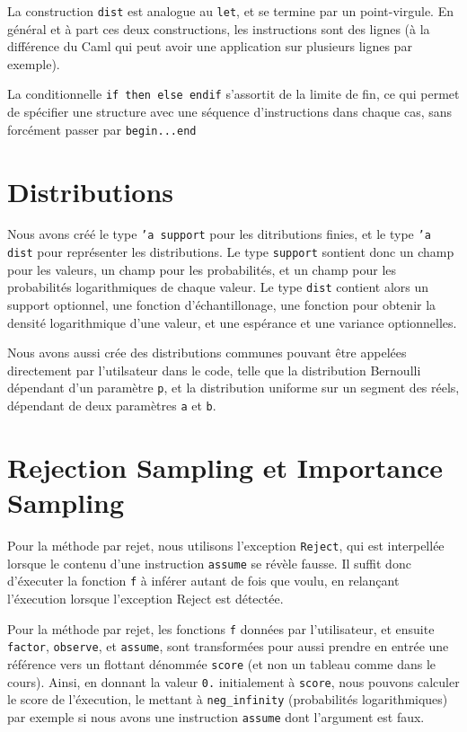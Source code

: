 \documentclass[svgnames]{article}
\begin{document}
La construction \lstinline{dist} est analogue au \lstinline{let}, et se termine par un point-virgule. En général et à part ces deux constructions, les instructions sont des lignes (à la différence du Caml qui peut avoir une application sur plusieurs lignes par exemple). 

La conditionnelle \lstinline{if then else endif} s'assortit de la limite de fin, ce qui permet de spécifier une structure avec une séquence d'instructions dans chaque cas, sans forcément passer par \lstinline{begin...end}

\section{Distributions}

Nous avons créé le type \texttt{'a support} pour les ditributions finies, et le type \texttt{'a dist} pour représenter les distributions. Le type \texttt{support} sontient donc un champ pour les valeurs, un champ pour les probabilités, et un champ pour les probabilités logarithmiques de chaque valeur. Le type \texttt{dist} contient alors un support optionnel, une fonction d'échantillonage, une fonction pour obtenir la densité logarithmique d'une valeur, et une espérance et une variance optionnelles.

Nous avons aussi crée des distributions communes pouvant être appelées directement par l'utilsateur dans le code, telle que la distribution Bernoulli dépendant d'un paramètre \texttt p, et la distribution uniforme sur un segment des réels, dépendant de deux paramètres \texttt a et \texttt b.

\section{Rejection Sampling et Importance Sampling}

Pour la méthode par rejet, nous utilisons l'exception \texttt{Reject}, qui est interpellée lorsque le contenu d'une instruction \texttt{assume} se révèle fausse. Il suffit donc d'éxecuter la fonction \texttt{f} à inférer autant de fois que voulu, en relançant l'éxecution lorsque l'exception Reject est détectée.

Pour la méthode par rejet, les fonctions \texttt f données par l'utilisateur, et ensuite \texttt{factor}, \texttt{observe}, et \texttt{assume}, sont transformées pour aussi prendre en entrée une référence vers un flottant dénommée \texttt{score} (et non un tableau comme dans le cours). Ainsi, en donnant la valeur \texttt{0.} initialement à \texttt{score}, nous pouvons calculer le score de l'éxecution, le mettant à \verb|neg_infinity| (probabilités logarithmiques) par exemple si nous avons une instruction \texttt{assume} dont l'argument est faux.
\end{document}
